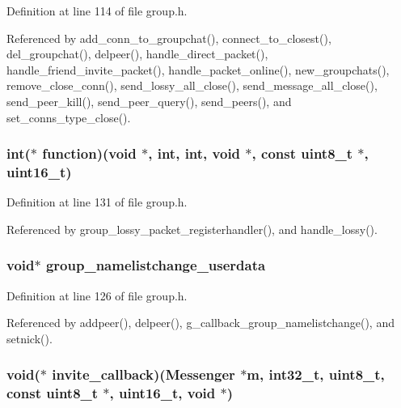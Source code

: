 Definition at line 114 of file group.\+h.



Referenced by add\+\_\+conn\+\_\+to\+\_\+groupchat(), connect\+\_\+to\+\_\+closest(), del\+\_\+groupchat(), delpeer(), handle\+\_\+direct\+\_\+packet(), handle\+\_\+friend\+\_\+invite\+\_\+packet(), handle\+\_\+packet\+\_\+online(), new\+\_\+groupchats(), remove\+\_\+close\+\_\+conn(), send\+\_\+lossy\+\_\+all\+\_\+close(), send\+\_\+message\+\_\+all\+\_\+close(), send\+\_\+peer\+\_\+kill(), send\+\_\+peer\+\_\+query(), send\+\_\+peers(), and set\+\_\+conns\+\_\+type\+\_\+close().

\hypertarget{struct_group___chats_acbfbbdaa6d4201766377ac50de985ae9}{
\subsubsection[{function}]{\setlength{\rightskip}{0pt plus 5cm}int($\ast$ function)(void $\ast$, int, int, void $\ast$, const uint8\+\_\+t $\ast$, uint16\+\_\+t)}}\label{struct_group___chats_acbfbbdaa6d4201766377ac50de985ae9}


Definition at line 131 of file group.\+h.



Referenced by group\+\_\+lossy\+\_\+packet\+\_\+registerhandler(), and handle\+\_\+lossy().

\hypertarget{struct_group___chats_a4c6b98ab07da7e69ecb7ae245f765984}{
\subsubsection[{group\+\_\+namelistchange\+\_\+userdata}]{\setlength{\rightskip}{0pt plus 5cm}void$\ast$ group\+\_\+namelistchange\+\_\+userdata}}\label{struct_group___chats_a4c6b98ab07da7e69ecb7ae245f765984}


Definition at line 126 of file group.\+h.



Referenced by addpeer(), delpeer(), g\+\_\+callback\+\_\+group\+\_\+namelistchange(), and setnick().

\hypertarget{struct_group___chats_a4ff3e6778b94fb9425a4b36572a0bf8b}{
\subsubsection[{invite\+\_\+callback}]{\setlength{\rightskip}{0pt plus 5cm}void($\ast$ invite\+\_\+callback)({\bf Messenger} $\ast${\bf m}, int32\+\_\+t, uint8\+\_\+t, const uint8\+\_\+t $\ast$, uint16\+\_\+t, void $\ast$)}}\label{struct_group___chats_a4ff3e6778b94fb9425a4b36572a0bf8b}


